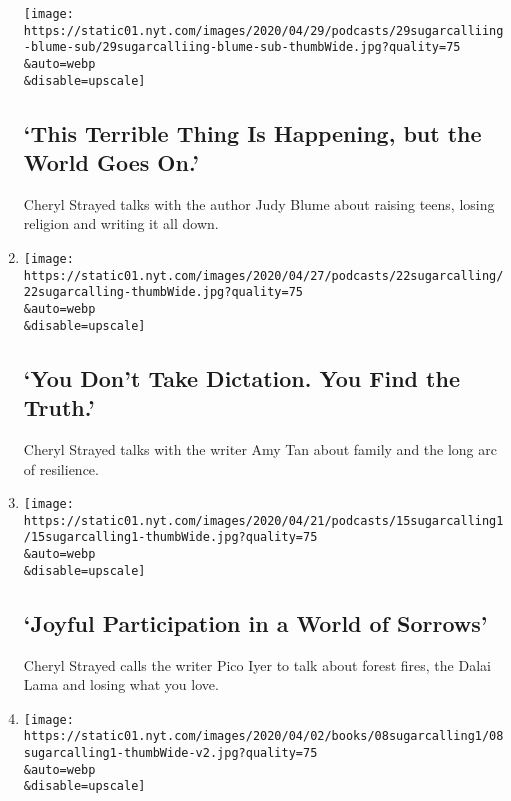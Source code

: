 \begin{enumerate}
  \texttt{[image: https://static01.nyt.com/images/2020/04/29/podcasts/29sugarcalliing-blume-sub/29sugarcalliing-blume-sub-thumbWide.jpg?quality=75\\\&auto=webp\\\&disable=upscale]}

  \hypertarget{this-terrible-thing-is-happening-but-the-world-goes-on}{%
  \subsection{`This Terrible Thing Is Happening, but the World Goes
  On.'}\label{this-terrible-thing-is-happening-but-the-world-goes-on}}

  Cheryl Strayed talks with the author Judy Blume about raising teens,
  losing religion and writing it all down.
\item
  \href{/2020/04/22/podcasts/sugar-calling-amy-tan-quarantine-virus.html}{}

  \texttt{[image: https://static01.nyt.com/images/2020/04/27/podcasts/22sugarcalling/22sugarcalling-thumbWide.jpg?quality=75\\\&auto=webp\\\&disable=upscale]}

  \hypertarget{you-dont-take-dictation-you-find-the-truth}{%
  \subsection{`You Don't Take Dictation. You Find the
  Truth.'}\label{you-dont-take-dictation-you-find-the-truth}}

  Cheryl Strayed talks with the writer Amy Tan about family and the long
  arc of resilience.
\item
  \href{/2020/04/15/podcasts/sugar-calling-pico-iyer-coronavirus.html}{}

  \texttt{[image: https://static01.nyt.com/images/2020/04/21/podcasts/15sugarcalling1/15sugarcalling1-thumbWide.jpg?quality=75\\\&auto=webp\\\&disable=upscale]}

  \hypertarget{joyful-participation-in-a-world-of-sorrows}{%
  \subsection{`Joyful Participation in a World of
  Sorrows'}\label{joyful-participation-in-a-world-of-sorrows}}

  Cheryl Strayed calls the writer Pico Iyer to talk about forest fires,
  the Dalai Lama and losing what you love.
\item
  \href{/2020/04/08/podcasts/sugar-calling-margaret-atwood-coronavirus.html}{}

  \texttt{[image: https://static01.nyt.com/images/2020/04/02/books/08sugarcalling1/08sugarcalling1-thumbWide-v2.jpg?quality=75\\\&auto=webp\\\&disable=upscale]}


\end{enumerate}
